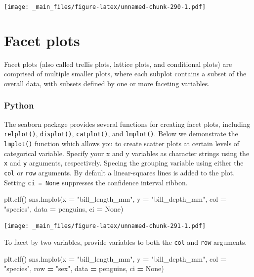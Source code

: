 \documentclass[
]{book}
\newenvironment{Shaded}{\begin{snugshade}}{\end{snugshade}}
\newcommand{\NormalTok}[1]{#1}
\newcommand{\OperatorTok}[1]{\textcolor[rgb]{0.81,0.36,0.00}{\textbf{#1}}}
\newcommand{\StringTok}[1]{\textcolor[rgb]{0.31,0.60,0.02}{#1}}
\newcommand{\VariableTok}[1]{\textcolor[rgb]{0.00,0.00,0.00}{#1}}
\begin{document}
\texttt{[image: \_main\_files/figure-latex/unnamed-chunk-290-1.pdf]}

\hypertarget{facet-plots}{%
\section{Facet plots}\label{facet-plots}}

Facet plots (also called trellis plots, lattice plots, and conditional plots) are comprised of multiple smaller plots, where each subplot contains a subset of the overall data, with subsets defined by one or more faceting variables.

\hypertarget{python-46}{%
\subsubsection*{Python}\label{python-46}}

The seaborn package provides several functions for creating facet plots, including \texttt{relplot()}, \texttt{displot()}, \texttt{catplot()}, and \texttt{lmplot()}. Below we demonstrate the \texttt{lmplot()} function which allows you to create scatter plots at certain levels of categorical variable. Specify your x and y variables as character strings using the \texttt{x} and \texttt{y} arguments, respectively. Specing the grouping variable using either the \texttt{col} or \texttt{row} arguments. By default a linear-squares lines is added to the plot. Setting \texttt{ci\ =\ None} suppresses the confidence interval ribbon.

\begin{Shaded}
\begin{Highlighting}[]
\NormalTok{plt.clf()}
\NormalTok{sns.lmplot(x }\OperatorTok{=} \StringTok{"bill\_length\_mm"}\NormalTok{, y }\OperatorTok{=} \StringTok{"bill\_depth\_mm"}\NormalTok{, }
\NormalTok{           col }\OperatorTok{=} \StringTok{"species"}\NormalTok{,}
\NormalTok{           data }\OperatorTok{=}\NormalTok{ penguins, ci }\OperatorTok{=} \VariableTok{None}\NormalTok{)}
\end{Highlighting}
\end{Shaded}

\texttt{[image: \_main\_files/figure-latex/unnamed-chunk-291-1.pdf]}

To facet by two variables, provide variables to both the \texttt{col} and \texttt{row} arguments.

\begin{Shaded}
\begin{Highlighting}[]
\NormalTok{plt.clf()}
\NormalTok{sns.lmplot(x }\OperatorTok{=} \StringTok{"bill\_length\_mm"}\NormalTok{, y }\OperatorTok{=} \StringTok{"bill\_depth\_mm"}\NormalTok{, }
\NormalTok{           col }\OperatorTok{=} \StringTok{"species"}\NormalTok{, row }\OperatorTok{=} \StringTok{"sex"}\NormalTok{,}
\NormalTok{           data }\OperatorTok{=}\NormalTok{ penguins, ci }\OperatorTok{=} \VariableTok{None}\NormalTok{)}
\end{Highlighting}
\end{Shaded}
\end{document}
